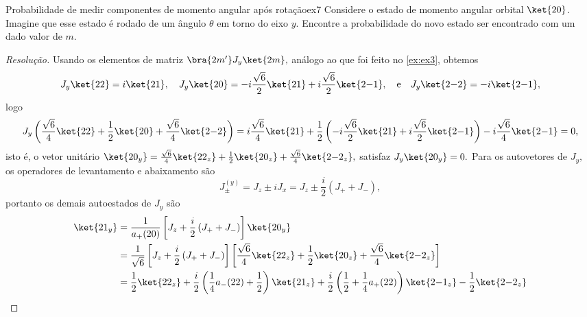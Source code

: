 \begin{exercício}{Probabilidade de medir componentes de momento angular após rotação}{ex7}
    Considere o estado de momento angular orbital \(\ket{2 0}\). Imagine que esse estado é rodado de um ângulo \(\theta\) em torno do eixo \(y\). Encontre a probabilidade do novo estado ser encontrado com um dado valor de \(m\).
\end{exercício}
\begin{proof}[Resolução]
    Usando os elementos de matriz \(\bra{2 m'}J_y\ket{2m},\) análogo ao que foi feito no \cref{ex:ex3}, obtemos
    \begin{equation*}
        J_y \ket{22} = i \ket{21},\quad
        J_y \ket{20} = -i\frac{\sqrt{6}}{2} \ket{21} + i \frac{\sqrt{6}}{2} \ket{2{-1}},\quad\text{e}\quad
        J_y \ket{2{-2}} = -i \ket{2{-1}},
    \end{equation*}
    logo
    \begin{equation*}
        J_y \left(\frac{\sqrt{6}}{4}\ket{22} + \frac12 \ket{20} + \frac{\sqrt{6}}{4} \ket{2{-2}}\right) 
        = i\frac{\sqrt{6}}{4} \ket{21} + \frac12 \left(-i \frac{\sqrt{6}}{2} \ket{21} + i \frac{\sqrt{6}}{2} \ket{2 {-1}}\right) - i\frac{\sqrt{6}}{4}\ket{2{-1}}
        = 0,
    \end{equation*}
    isto é, o vetor unitário \(\ket{20_y} = \frac{\sqrt{6}}{4}\ket{22_z} + \frac12 \ket{20_z} + \frac{\sqrt{6}}{4} \ket{2{-2}_z},\) satisfaz \(J_y \ket{20_y} = 0.\) Para os autovetores de \(J_y,\) os operadores de levantamento e abaixamento são 
    \begin{equation*}
        J^{(y)}_{\pm} = J_z \pm i J_x = J_z \pm \frac{i}{2} \left(J_+ + J_-\right),
    \end{equation*}
    portanto os demais autoestados de \(J_y\) são
    \begin{align*}
        \ket{21_y} &= \frac{1}{a_+(20)}\left[J_z + \frac{i}{2} \left(J_+ + J_-\right)\right]\ket{20_y}\\
                   &= \frac{1}{\sqrt{6}}\left[J_z + \frac{i}{2} \left(J_+ + J_-\right)\right]\left[\frac{\sqrt{6}}{4}\ket{22_z} + \frac12 \ket{20_z} + \frac{\sqrt{6}}{4} \ket{2{-2}_z}\right]\\
                   &= \frac{1}{2}\ket{22_z} + \frac{i}{2}\left(\frac{1}{4} a_-(22) + \frac12 \right)\ket{21_z} + \frac{i}{2}\left(\frac12 + \frac{1}{4} a_+(22)\right)\ket{2{-1}_z} - \frac{1}{2}\ket{2{-2}_z}\\

\end{align*}
\end{proof}
